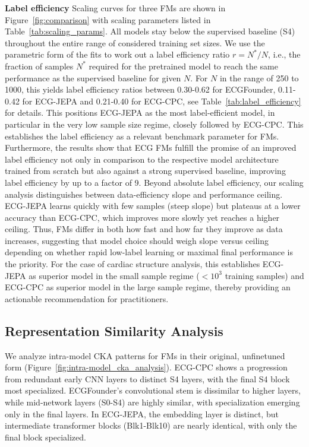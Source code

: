 \documentclass{article}
\newcommand{\heading}[1]{\noindent\textbf{#1}}
\begin{document}
        \heading{Label efficiency} 
        Scaling curves for three FMs are shown in Figure~\ref{fig:comparison} with scaling parameters listed in Table~\ref{tab:scaling_params}. All models stay below the supervised baseline (S4) throughout the entire range of considered training set sizes. We use the parametric form of the fits to work out a label efficiency ratio $r=N^*/N$, i.e., the fraction of samples $N^*$ required for the pretrained model to reach the same performance as the supervised baseline for given $N$. For $N$ in the range of 250 to 1000, this yields label efficiency ratios between 0.30-0.62 for ECGFounder, 0.11-0.42 for ECG-JEPA and 0.21-0.40 for ECG-CPC, see Table~\ref{tab:label_efficiency} for details. This positions ECG-JEPA as the most label-efficient model, in particular in the very low sample size regime, closely followed by ECG-CPC. This establishes the label efficiency as a relevant benchmark parameter for FMs. Furthermore, the results show that ECG FMs fulfill the promise of an improved label efficiency not only in comparison to the respective model architecture trained from scratch but also against a strong supervised baseline, improving label efficiency by up to a factor of 9. Beyond absolute label efficiency, our scaling analysis distinguishes between data-efficiency slope and performance ceiling. ECG-JEPA learns quickly with few samples (steep slope) but plateaus at a lower accuracy than ECG-CPC, which improves more slowly yet reaches a higher ceiling. Thus, FMs differ in both how fast and how far they improve as data increases, suggesting that model choice should weigh slope versus ceiling depending on whether rapid low-label learning or maximal final performance is the priority. For the case of cardiac structure analysis, this establishes ECG-JEPA as superior model in the small sample regime ($<10^3$ training samples) and ECG-CPC as superior model in the large sample regime, thereby providing an actionable recommendation for practitioners.


        \subsection{Representation Similarity Analysis}
        We analyze intra-model CKA patterns for FMs in their original, unfinetuned form (Figure~\ref{fig:intra-model_cka_analysis}). ECG-CPC shows a progression from redundant early CNN layers to distinct S4 layers, with the final S4 block most specialized. ECGFounder’s convolutional stem is dissimilar to higher layers, while mid-network layers (S0-S4) are highly similar, with specialization emerging only in the final layers. In ECG-JEPA, the embedding layer is distinct, but intermediate transformer blocks (Blk1-Blk10) are nearly identical, with only the final block specialized. 
\end{document}
